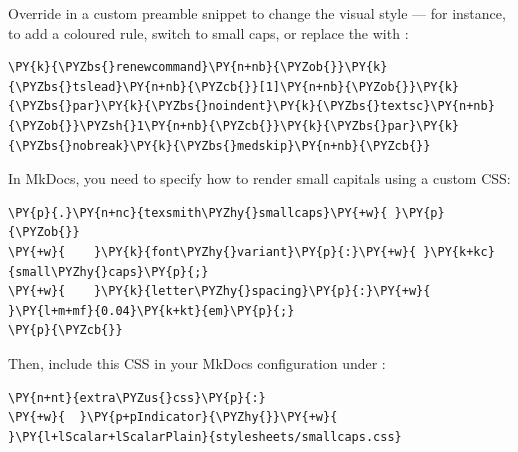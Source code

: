 \documentclass[a4paper,twoside]{article}
\begin{document}
Override  in a custom preamble snippet to change the visual style --- for instance, to add a coloured rule, switch to small caps, or replace the  with :
\begin{tscode}[lang=latex, engine=pygments]
\begin{Verbatim}[commandchars=\\\{\},breaklines, breakanywhere, commandchars=\\\{\}]
\PY{k}{\PYZbs{}renewcommand}\PY{n+nb}{\PYZob{}}\PY{k}{\PYZbs{}tslead}\PY{n+nb}{\PYZcb{}}[1]\PY{n+nb}{\PYZob{}}\PY{k}{\PYZbs{}par}\PY{k}{\PYZbs{}noindent}\PY{k}{\PYZbs{}textsc}\PY{n+nb}{\PYZob{}}\PYZsh{}1\PY{n+nb}{\PYZcb{}}\PY{k}{\PYZbs{}par}\PY{k}{\PYZbs{}nobreak}\PY{k}{\PYZbs{}medskip}\PY{n+nb}{\PYZcb{}}
\end{Verbatim}
\end{tscode}
\begin{tscallout}[kind=note]
In MkDocs, you need to specify how to render small capitals using a custom CSS:
\begin{tscode}[lang=css, engine=pygments]
\begin{Verbatim}[commandchars=\\\{\},breaklines, breakanywhere, commandchars=\\\{\}]
\PY{p}{.}\PY{n+nc}{texsmith\PYZhy{}smallcaps}\PY{+w}{ }\PY{p}{\PYZob{}}
\PY{+w}{    }\PY{k}{font\PYZhy{}variant}\PY{p}{:}\PY{+w}{ }\PY{k+kc}{small\PYZhy{}caps}\PY{p}{;}
\PY{+w}{    }\PY{k}{letter\PYZhy{}spacing}\PY{p}{:}\PY{+w}{ }\PY{l+m+mf}{0.04}\PY{k+kt}{em}\PY{p}{;}
\PY{p}{\PYZcb{}}
\end{Verbatim}
\end{tscode}
Then, include this CSS in your MkDocs configuration under :
\begin{tscode}[lang=yaml, engine=pygments]
\begin{Verbatim}[commandchars=\\\{\},breaklines, breakanywhere, commandchars=\\\{\}]
\PY{n+nt}{extra\PYZus{}css}\PY{p}{:}
\PY{+w}{  }\PY{p+pIndicator}{\PYZhy{}}\PY{+w}{ }\PY{l+lScalar+lScalarPlain}{stylesheets/smallcaps.css}
\end{Verbatim}
\end{tscode}
\end{tscallout}
\end{document}
